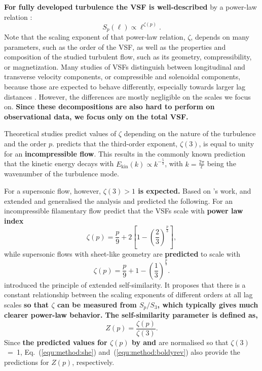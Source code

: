 \textbf{For fully developed turbulence the VSF is well-described} by a power-law relation \citep{Kolmogorov1941,She1994,Boldyrev2002}:
\begin{equation}
	\mathit{S}_p (\ell) \propto \ell^{\zeta(p)}.
    \label{equ:method:propto_zeta}
\end{equation}
Note that the scaling exponent of that power-law relation, $\zeta$, depends on many parameters, such as the order of the VSF, as well as the properties and composition of the studied turbulent flow, such as its geometry, compressibility, or magnetization.
Many studies of VSFs distinguish between longitudinal and transverse velocity components, or compressible and solenoidal components, because those are expected to behave differently, especially towards larger lag distances \citep{Gotoh2002,Schmidt2008,Benzi2010}.
However, the differences are mostly negligible on the scales we focus on. 
\textbf{Since these decompositions are also hard to perform on observational data, we focus only on the total VSF.}

Theoretical studies predict values of $\zeta$ depending on the nature of the turbulence and the order $p$.
\citet{Kolmogorov1941} predicts that the third-order exponent, $\zeta(3)$, is equal to unity for an \textbf{incompressible flow}.
This results in the commonly known prediction that the kinetic energy decays with $E_{\mathrm{kin}}(k) \propto k^{-\frac{5}{3}}$, with $k = \frac{2 \pi}{\ell}$ being the wavenumber of the turbulence mode.

For a supersonic flow, however, \textbf{$\zeta(3) >1$ is expected.}
Based on \citeauthor{Kolmogorov1941}'s work, \citet{She1994} and \citet{Boldyrev2002} extended and generalised the analysis and predicted the following.
For an incompressible filamentary flow \citet{She1994} predict that
the VSFs scale with \textbf{power law index}
\begin{equation}
	\zeta(p) = \frac{p}{9} + 2 \left[ 1 - \left( \frac{2}{3} \right)^{\frac{p}{3}} \right] ,
	\label{equ:method:she}
\end{equation}
while supersonic flows with sheet-like geometry are \textbf{predicted} to scale with \citep{Boldyrev2002}
\begin{equation}
	\zeta(p) = \frac{p}{9} + 1 - \left( \frac{1}{3} \right)^{\frac{p}{3}}.
	\label{equ:method:boldyrev}
\end{equation}
\citet{Benzi1993} introduced the principle of extended self-similarity.
It proposes that there is a constant relationship between the scaling
exponents of different orders at all lag scales \textbf{so that $\zeta$ can be measured from $S_p/S_3$, which typically gives much clearer power-law behavior.}
\textbf{The self-similarity parameter is defined as,}
\begin{equation}
	Z(p) = \frac{\zeta(p)}{\zeta(3)}.
	\label{equ:method:z_def}
\end{equation} 
Since \textbf{the predicted values for $\zeta(p)$ by \citet{She1994} and \citet{Boldyrev2002}} are normalised so that $\zeta(3)$~=~1, Eq.~(\ref{equ:method:she}) and~(\ref{equ:method:boldyrev}) also provide the predictions for $Z(p)$, respectively.

